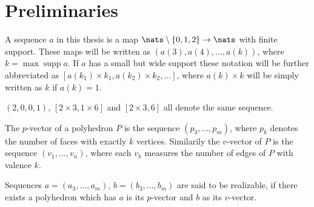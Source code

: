 \section{Preliminaries}

\begin{definition}[Sequence]
  A sequence $a$ in this thesis is a map $\nats \setminus \{0, 1, 2\} \rightarrow \nats$ with finite support. These maps will be written as $(a(3), a(4), ..., a(k))$, where $k = \operatorname{max} \operatorname{supp} a$. If $a$ has a small but wide support these notation will be further abbreviated as $[a(k_1) \times k_1, a(k_2) \times k_2, ...]$, where $a(k) \times k$ will be simply written as $k$ if $a(k) = 1$.
\end{definition}
\begin{example}
  $(2, 0, 0, 1)$, $[2 \times 3, 1 \times 6]$ and $[2 \times 3, 6]$ all denote the same sequence. 
\end{example}
\begin{definition}\label{def:relizable}
  The $p$-vector of a polyhedron $P$ is the sequence $(p_3, \dots, p_m)$, where $p_k$ denotes the number of faces with exactly $k$ vertices. Similarily the $v$-vector of $P$ is the sequence $(v_1, \dots, v_n)$, where each $v_k$ measures the number of edges of $P$ with valence $k$. 
\end{definition}

\begin{definition}
Sequences $a = (a_3, \dots, a_m)$, $b = (b_3, \dots, b_m)$ are said to be realizable, if there exists a polyhedron which has $a$ is its $p$-vector and $b$ as its $v$-vector.
\end{definition}

